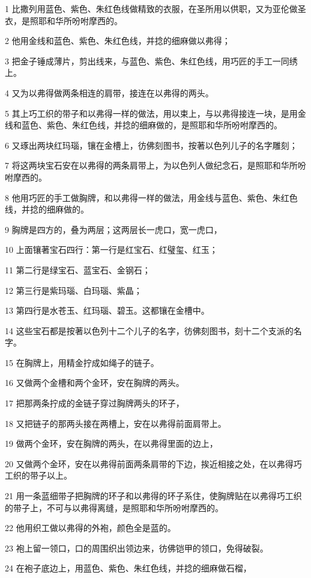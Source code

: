 \par 1 比撒列用蓝色、紫色、朱红色线做精致的衣服，在圣所用以供职，又为亚伦做圣衣，是照耶和华所吩咐摩西的。
\par 2 他用金线和蓝色、紫色、朱红色线，并捻的细麻做以弗得；
\par 3 把金子锤成薄片，剪出线来，与蓝色、紫色、朱红色线，用巧匠的手工一同绣上。
\par 4 又为以弗得做两条相连的肩带，接连在以弗得的两头。
\par 5 其上巧工织的带子和以弗得一样的做法，用以束上，与以弗得接连一块，是用金线和蓝色、紫色、朱红色线，并捻的细麻做的，是照耶和华所吩咐摩西的。
\par 6 又琢出两块红玛瑙，镶在金槽上，彷佛刻图书，按著以色列儿子的名字雕刻；
\par 7 将这两块宝石安在以弗得的两条肩带上，为以色列人做纪念石，是照耶和华所吩咐摩西的。
\par 8 他用巧匠的手工做胸牌，和以弗得一样的做法，用金线与蓝色、紫色、朱红色线，并捻的细麻做的。
\par 9 胸牌是四方的，叠为两层；这两层长一虎口，宽一虎口，
\par 10 上面镶著宝石四行：第一行是红宝石、红璧玺、红玉；
\par 11 第二行是绿宝石、蓝宝石、金钢石；
\par 12 第三行是紫玛瑙、白玛瑙、紫晶；
\par 13 第四行是水苍玉、红玛瑙、碧玉。这都镶在金槽中。
\par 14 这些宝石都是按著以色列十二个儿子的名字，彷佛刻图书，刻十二个支派的名字。
\par 15 在胸牌上，用精金拧成如绳子的链子。
\par 16 又做两个金槽和两个金环，安在胸牌的两头。
\par 17 把那两条拧成的金链子穿过胸牌两头的环子，
\par 18 又把链子的那两头接在两槽上，安在以弗得前面肩带上。
\par 19 做两个金环，安在胸牌的两头，在以弗得里面的边上，
\par 20 又做两个金环，安在以弗得前面两条肩带的下边，挨近相接之处，在以弗得巧工织的带子以上。
\par 21 用一条蓝细带子把胸牌的环子和以弗得的环子系住，使胸牌贴在以弗得巧工织的带子上，不可与以弗得离缝，是照耶和华所吩咐摩西的。
\par 22 他用织工做以弗得的外袍，颜色全是蓝的。
\par 23 袍上留一领口，口的周围织出领边来，彷佛铠甲的领口，免得破裂。
\par 24 在袍子底边上，用蓝色、紫色、朱红色线，并捻的细麻做石榴，
